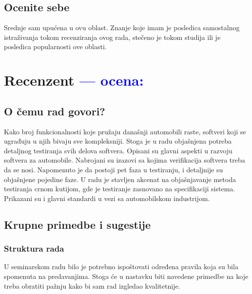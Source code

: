 \documentclass[a4paper]{report}
\newcommand{\odgovor}[1]{\textcolor{blue}{#1}}
\begin{document}
\section{Ocenite sebe}
Srednje sam upućena u ovu oblast. Znanje koje imam je posledica samostalnog istraživanja tokom recenziranja ovog rada, stečeno je tokom studija ili je posledica popularnosti ove oblasti.

\chapter{Recenzent \odgovor{--- ocena:} }


\section{O čemu rad govori?}
Kako broj funkcionalnosti koje pružaju današnji automobili raste, softveri koji se ugrađuju u njih bivaju sve kompleksniji. Stoga je u radu objašnjena potreba detaljnog testiranja svih delova softvera. Opisani su glavni aspekti u razvoju softvera za automobile.  Nabrojani su izazovi sa kojima verifikacija softvera treba da se nosi. Napomenuto je da postoji  pet faza u testiranju, i detaljnije su objašnjene pojedine faze. U radu je stavljen akcenat na objašnjavanje metoda testiranja crnom kutijom, gde je testiranje zasnovano na specifikaciji sistema. Prikazani su i glavni standardi u vezi sa automobilskom industrijom.

\section{Krupne primedbe i sugestije}
\subsection{Struktura rada}
U seminarskom radu bilo je potrebno ispoštovati određena pravila koja su bila spomenuta na predavanjima. Stoga će u nastavku biti navedene primedbe na koje treba obratiti pažnju kako bi sam rad izgledao kvalitetnije.  
\end{document}
